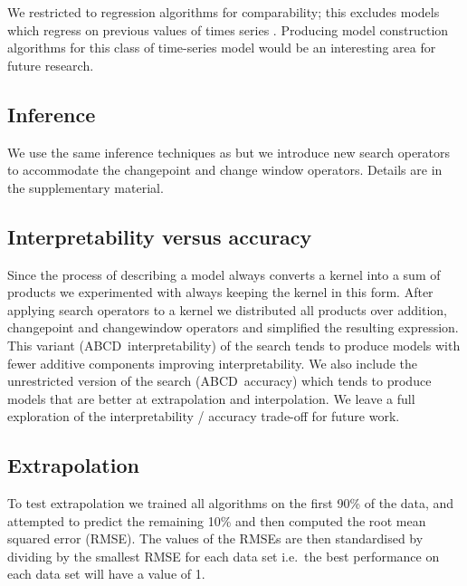 \documentclass[letterpaper]{article}
\def\ie{i.e.\ }
\newcommand{\procedurename}{ABCD\ }
\begin{document}
We restricted to regression algorithms for comparability; this excludes models which regress on previous values of times series \citep[e.g.][]{box2013time}.
Producing model construction algorithms for this class of time-series model would be an interesting area for future research.

\subsection{Inference}

We use the same inference techniques as \cite{DuvLloGroetal13} but we introduce new search operators to accommodate the changepoint and change window operators.
Details are in the supplementary material.

\subsection{Interpretability versus accuracy}

Since the process of describing a model always converts a kernel into a sum of products we experimented with always keeping the kernel in this form.
After applying search operators to a kernel we distributed all products over addition, changepoint and changewindow operators and simplified the resulting expression.
This variant (\procedurename interpretability) of the search tends to produce models with fewer additive components improving interpretability.
We also include the unrestricted version of the search (\procedurename accuracy) which tends to produce models that are better at extrapolation and interpolation.
%
We leave a full exploration of the interpretability / accuracy trade-off for future work.

\subsection{Extrapolation}

To test extrapolation we trained all algorithms on the first 90\% of the data, and attempted to predict the remaining 10\% and then computed the root mean squared error (RMSE).
The values of the RMSEs are then standardised by dividing by the smallest RMSE for each data set \ie the best performance on each data set will have a value of 1.
\end{document}
